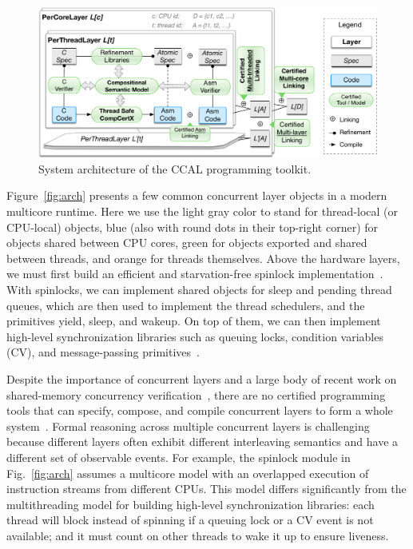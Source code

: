 \begin{figure}[t]
\centering
\includegraphics[scale=.5]{figs/ccal/tool_chain}
\caption{System architecture of the CCAL programming toolkit.}
\label{fig:toolchain}
\end{figure}

Figure~\ref{fig:arch} presents a few common concurrent layer objects
in a modern multicore runtime. Here we
use the light gray color to stand for thread-local (or CPU-local)
objects, blue (also with round dots in their top-right corner) for objects shared between CPU cores, green for objects exported and shared between threads, and orange for threads
themselves. Above the hardware layers, we must first build an efficient
and starvation-free spinlock implementation~\cite{mcs91}. 
With spinlocks, we can implement shared objects for sleep and pending thread
queues, which are then used to implement the thread schedulers,
and the primitives yield, sleep, and wakeup. 
On top of them,
we can then implement high-level synchronization libraries such as
queuing locks, condition variables (CV), and message-passing
primitives~\cite{ospp11}.

Despite the importance of concurrent layers and a large body of recent
work on shared-memory concurrency
verification~\cite{ohearn:concur04,brookes:concur04,feng07:sagl,vafeiadis:marriage,LRG,gotsman13,Turon13popl,nanevski13,sergey15pldi,iris15,pinto16,lili16,xu16},
there are no certified programming tools that can
specify, compose, and compile concurrent layers to form a whole
system~\cite{sfm16}.
Formal reasoning across multiple concurrent
layers is challenging because different layers often exhibit different
interleaving semantics and have a different set of observable
events. For example, the spinlock module in Fig.~\ref{fig:arch}
assumes a multicore model with an overlapped execution of instruction
streams from different CPUs. This model differs significantly
from the multithreading model for building high-level synchronization
libraries: each thread will block instead of  spinning if a queuing
lock or a CV event
is not available; and
it must count on other threads to wake it up to ensure liveness.


